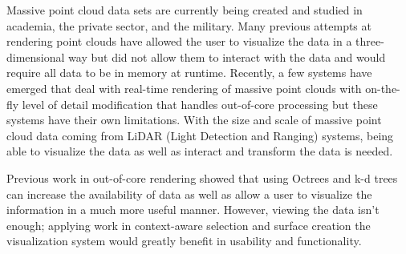 \begin{abstractpage}
Massive point cloud data sets are currently being created and studied in
academia, the private sector, and the military. Many previous attempts at
rendering point clouds have allowed the user to visualize the data in a
three-dimensional way but did not allow them to interact with the data and would
require all data to be in memory at runtime. Recently, a few systems have
emerged that deal with real-time rendering of massive point clouds with
on-the-fly level of detail modification that handles out-of-core processing but
these systems have their own limitations. With the size and scale of massive
point cloud data coming from LiDAR (Light Detection and Ranging) systems, being
able to visualize the data as well as interact and transform the data is needed.

Previous work in out-of-core rendering
\cite{3_wenzel2014out,4_goswami_zhang_pajarola_gobbetti_2010,5_richter_2010}
showed that using Octrees and k-d trees can increase the availability of data as
well as allow a user to visualize the information in a much more useful manner.
However, viewing the data isn't enough; applying work in context-aware selection
\cite{2_yu:hal-01178051} and surface creation \cite{1_VAST:VAST11:105-112} the
visualization system would greatly benefit in usability and functionality.
\end{abstractpage}
